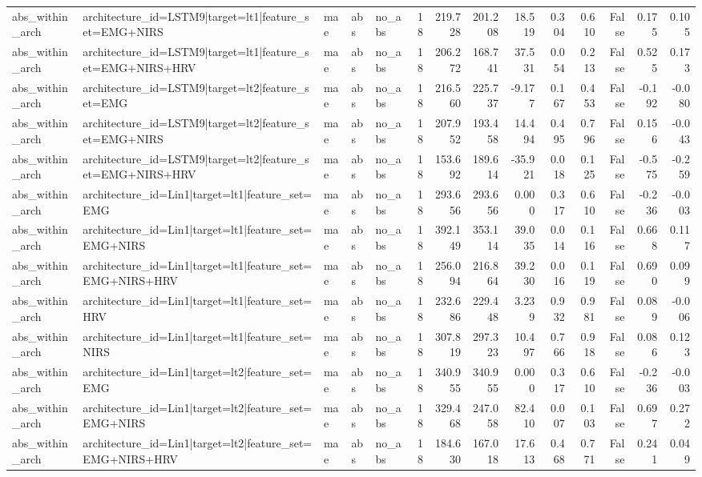 \begin{table}
\begin{tabular}{lllllrrrrrrrrr}
abs_within_arch & architecture_id=LSTM9|target=lt1|feature_set=EMG+NIRS & mae & abs & no_abs & 18 & 219.728 & 201.208 & 18.519 & 0.304 & 0.610 & False & 0.175 & 0.105 \\
abs_within_arch & architecture_id=LSTM9|target=lt1|feature_set=EMG+NIRS+HRV & mae & abs & no_abs & 18 & 206.272 & 168.741 & 37.531 & 0.054 & 0.213 & False & 0.525 & 0.173 \\
abs_within_arch & architecture_id=LSTM9|target=lt2|feature_set=EMG & mae & abs & no_abs & 18 & 216.560 & 225.737 & -9.177 & 0.167 & 0.453 & False & -0.192 & -0.080 \\
abs_within_arch & architecture_id=LSTM9|target=lt2|feature_set=EMG+NIRS & mae & abs & no_abs & 18 & 207.952 & 193.458 & 14.494 & 0.495 & 0.796 & False & 0.156 & -0.043 \\
abs_within_arch & architecture_id=LSTM9|target=lt2|feature_set=EMG+NIRS+HRV & mae & abs & no_abs & 18 & 153.692 & 189.614 & -35.921 & 0.018 & 0.125 & False & -0.575 & -0.259 \\
abs_within_arch & architecture_id=Lin1|target=lt1|feature_set=EMG & mae & abs & no_abs & 18 & 293.656 & 293.656 & 0.000 & 0.317 & 0.610 & False & -0.236 & -0.003 \\
abs_within_arch & architecture_id=Lin1|target=lt1|feature_set=EMG+NIRS & mae & abs & no_abs & 18 & 392.149 & 353.114 & 39.035 & 0.014 & 0.116 & False & 0.668 & 0.117 \\
abs_within_arch & architecture_id=Lin1|target=lt1|feature_set=EMG+NIRS+HRV & mae & abs & no_abs & 18 & 256.094 & 216.864 & 39.230 & 0.016 & 0.119 & False & 0.690 & 0.099 \\
abs_within_arch & architecture_id=Lin1|target=lt1|feature_set=HRV & mae & abs & no_abs & 18 & 232.686 & 229.448 & 3.239 & 0.932 & 0.981 & False & 0.089 & -0.006 \\
abs_within_arch & architecture_id=Lin1|target=lt1|feature_set=NIRS & mae & abs & no_abs & 18 & 307.819 & 297.323 & 10.497 & 0.766 & 0.918 & False & 0.086 & 0.123 \\
abs_within_arch & architecture_id=Lin1|target=lt2|feature_set=EMG & mae & abs & no_abs & 18 & 340.955 & 340.955 & 0.000 & 0.317 & 0.610 & False & -0.236 & -0.003 \\
abs_within_arch & architecture_id=Lin1|target=lt2|feature_set=EMG+NIRS & mae & abs & no_abs & 18 & 329.468 & 247.058 & 82.410 & 0.007 & 0.103 & False & 0.697 & 0.272 \\
abs_within_arch & architecture_id=Lin1|target=lt2|feature_set=EMG+NIRS+HRV & mae & abs & no_abs & 18 & 184.630 & 167.018 & 17.613 & 0.468 & 0.771 & False & 0.241 & 0.049 \\

\end{tabular}
\end{table}
